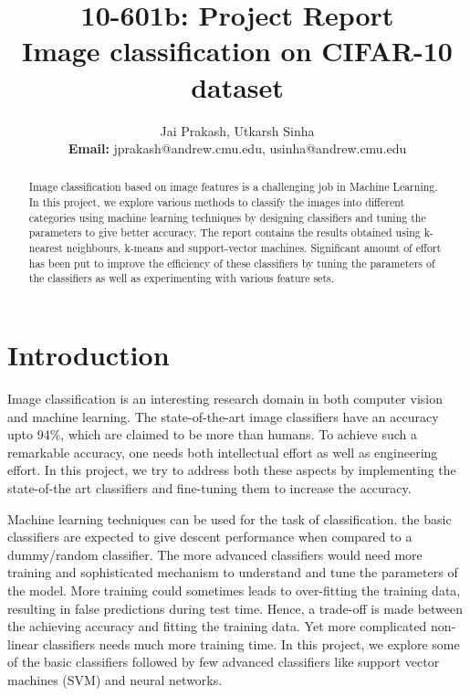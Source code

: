 \documentclass{article} %
\author{Jai Prakash, Utkarsh Sinha \\ \textbf{Email:} jprakash@andrew.cmu.edu, usinha@andrew.cmu.edu}
\title{10-601b: Project Report\\Image classification on CIFAR-10 dataset
}
\begin{document}
\maketitle

\begin{abstract}
Image classification based on image features is a challenging job in Machine Learning. In this project, we explore various methods to classify the images into different categories using machine learning techniques by designing classifiers and tuning the parameters to give better accuracy. The report contains the results obtained using k-nearest neighbours, k-means and support-vector machines. Significant amount of effort has been put to improve the efficiency of these classifiers by tuning the parameters of the classifiers as well as experimenting with various feature sets. %
\end{abstract}

\section{Introduction}
Image classification is an interesting research domain in both computer vision and machine learning. The state-of-the-art image classifiers have an accuracy upto 94\%, which are claimed to be more than humans. To achieve such a remarkable accuracy, one needs both intellectual effort as well as engineering effort. In this project, we try to address both these aspects by implementing the state-of-the art classifiers and fine-tuning them to increase the accuracy.

Machine learning techniques can be used for the task of classification. the basic classifiers are expected to give descent performance when compared to a dummy/random classifier. The more advanced classifiers would need more training and sophisticated mechanism to understand and tune the parameters of the model. More training could sometimes leads to over-fitting the training data, resulting in false predictions during test time. Hence, a trade-off is made between the achieving accuracy and fitting the training data. Yet more complicated non-linear classifiers needs much more training time. In this project, we explore some of the basic classifiers followed by few advanced classifiers like support vector machines (SVM) and neural networks.
\end{document}
